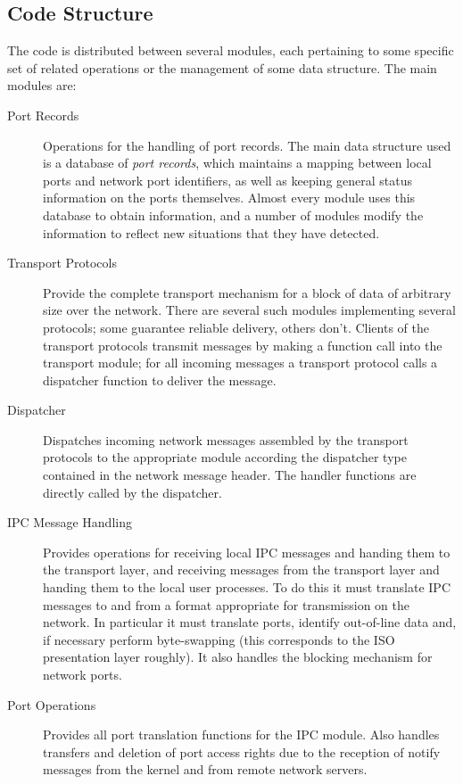 \subsection{Code Structure}
The code is distributed between several modules, each pertaining to some
specific set of related operations or the management of some data structure.
The main modules are:
\begin{description}
\item[Port Records] Operations for the handling of port records.  The main
data structure used is a database of {\it port records}, which maintains a
mapping between local ports and network port identifiers, as well as keeping
general status information on the ports themselves.  Almost every module
uses this database to obtain information, and a number of modules modify the
information to reflect new situations that they have detected.

\item[Transport Protocols] Provide the complete transport mechanism for a
block of data of arbitrary size over the network.  There are several such
modules implementing several protocols; some guarantee reliable delivery,
others don't.  Clients of the transport protocols transmit messages by making
a function call into the transport module;  for all incoming messages a
transport protocol calls a dispatcher function to deliver the message.

\item[Dispatcher] Dispatches incoming network messages assembled by
the transport protocols to the appropriate module according the dispatcher
type contained in the network message header.  The handler functions are
directly called by the dispatcher.

\item[IPC Message Handling]  Provides operations for receiving local IPC
messages and handing them to the transport layer, and receiving messages
from the transport layer and handing them to the local user processes.  To
do this it must translate IPC messages to and from a format appropriate for
transmission on the network.  In particular it must translate ports,
identify out-of-line data and, if necessary perform byte-swapping (this
corresponds to the ISO presentation layer roughly).  It also handles the
blocking mechanism for network ports.

\item[Port Operations] Provides all port translation functions for the IPC
module.  Also handles transfers and deletion of port access rights due to
the reception of notify messages from the kernel and from remote network
servers.


\end{description}
